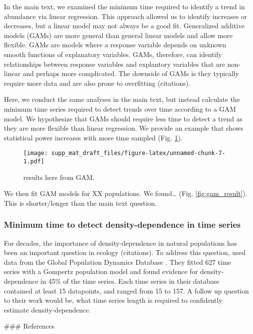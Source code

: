 \documentclass[12pt,]{article}
\begin{document}
In the main text, we examined the minimum time required to identify a
trend in abundance via linear regression. This approach allowed us to
identify increases or decreases, but a linear model may not always be a
good fit. Generalized additive models (GAMs) are more general than
general linear models and allow more flexible. GAMs are models where a
response variable depends on unknown smooth functions of explanatory
variables. GAMs, therefore, can identify relationships between response
variables and explantory variables that are non-linear and perhaps more
complicated. The downside of GAMs is they typically require more data
and are also prone to overfitting (citations).

Here, we conduct the same analyses in the main text, but instead
calculate the minimum time series required to detect trends over time
according to a GAM model. We hypothesize that GAMs should require less
time to detect a trend as they are more flexible than linear regression.
We provide an example that shows statistical power increases with more
time sampled (Fig. \ref{fig:gam_example}).

\begin{figure}[htbp]
\centering
\texttt{[image: supp\_mat\_draft\_files/figure-latex/unnamed-chunk-7-1.pdf]}
\caption{results here from GAM.\label{fig:gam_example}}
\end{figure}

We then fit GAM models for XX populations. We found\ldots{} (Fig.
\ref{fig:gam_result}). This is shorter/longer than the main text
question.

\subsubsection{Minimum time to detect density-dependence in time
series}\label{minimum-time-to-detect-density-dependence-in-time-series}

For decades, the importance of density-dependence in natural populations
has been an important question in ecology (citations). To address this
question, \citet{Knape2012} used data from the Global Population
Dynamics Database \citep{GPDD2010}. They fitted 627 time series with a
Gompertz population model and found evidence for density-dependence in
45\% of the time series. Each time series in their database contained at
least 15 datapoints, and ranged from 15 to 157. A follow up question to
their work would be, what time series length is required to confidently
estimate density-dependence.

\clearpage
\#\#\# References


\end{document}
